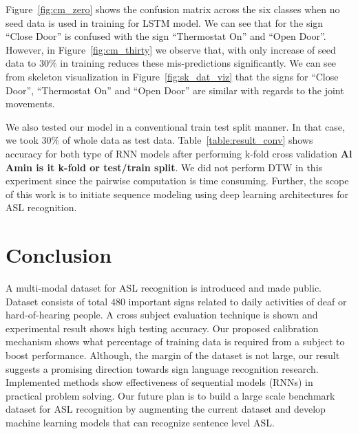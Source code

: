 \documentclass[10pt,twocolumn,letterpaper]{article}
\begin{document}
Figure~\ref{fig:cm_zero} shows the 
 confusion matrix  across the six classes when no seed data is used in training for LSTM model. We can see that for the 
 sign ``Close Door'' is confused with the sign ``Thermostat On'' and ``Open Door''. However, in Figure~\ref{fig:cm_thirty} we observe that, with only increase of seed data to $30\%$ in training  reduces these mis-predictions significantly. We can see from skeleton visualization in Figure~\ref{fig:sk_dat_viz} that the signs for 
 ``Close Door'', ``Thermostat On'' and ``Open Door'' are  similar with regards to the joint movements. 
 
 
We also tested our model in a  conventional train test split manner. In that case, we took $30\%$ of whole data as test data. Table~\ref{table:result_conv} shows accuracy for both type of RNN models after performing k-fold cross validation {\bf Al Amin is it k-fold or test/train split}. We did not perform DTW in this experiment since the pairwise computation is time consuming. Further, the scope of  this work is to initiate sequence modeling using deep learning architectures for ASL recognition.

 


\section{Conclusion}
A multi-modal dataset for ASL recognition is introduced and made public. Dataset consists of total $480$ important signs related to daily activities of deaf or hard-of-hearing people. A cross subject evaluation technique is shown and experimental result shows high testing accuracy. Our proposed calibration mechanism shows what percentage of training data is required from a subject to boost performance. Although, the margin of the dataset is not large, our result suggests a promising direction towards sign language recognition research. Implemented methods show effectiveness of sequential models (RNNs) in practical problem solving. Our future plan is to build a large scale benchmark dataset for ASL recognition by augmenting the current dataset and develop machine learning models that can recognize sentence level ASL.




{\small


}
\end{document}
